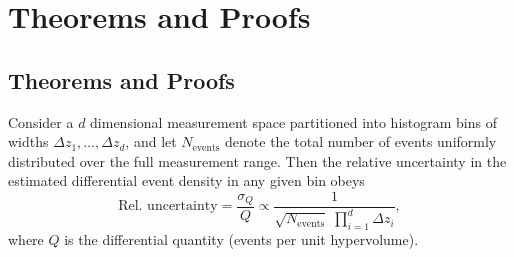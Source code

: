 \chapter{Theorems and Proofs}

\section{Theorems and Proofs}

\setcounter{phfthm@theorem}{0}

\begin{theorem}
\noproofref
                
                Consider a \(d\) dimensional measurement space partitioned into histogram bins of widths \(\Delta z_1,\dots,\Delta z_d\), and let \(N_{\text{events}}\) denote the total number of events uniformly distributed over the full measurement range.
                Then the relative uncertainty in the estimated differential event density in any given bin obeys
                \begin{equation}
                    \text{Rel.\ uncertainty} = \frac{\sigma_{Q}}{Q} \propto \frac{1}{\sqrt{N_{\text{events}}}\;\prod_{i=1}^d\Delta z_i},
                \end{equation}
                where \(Q\) is the differential quantity (events per unit hypervolume).
            \end{theorem}

